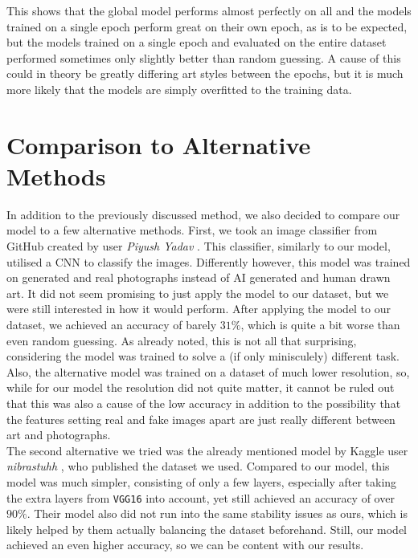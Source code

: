 This shows that the global model performs almost perfectly on all and the models trained on a single epoch perform great on their own epoch, as is to be expected,
but the models trained on a single epoch and evaluated on the entire dataset performed sometimes only slightly better than random guessing.
A cause of this could in theory be greatly differing art styles between the epochs, but it is much more likely that the models
are simply overfitted to the training data. \\

\section{Comparison to Alternative Methods}

In addition to the previously discussed method, we also decided to compare our model to a few alternative methods.
First, we took an image classifier from GitHub created by user \textit{Piyush Yadav} \cite{github_model}.
This classifier, similarly to our model, utilised a CNN to classify the images.
Differently however, this model was trained on generated and real photographs instead of AI generated and human drawn art.
It did not seem promising to just apply the model to our dataset, but we were still interested in how it would perform.
After applying the model to our dataset, we achieved an accuracy of barely $31 \%$, which is quite a bit worse than even random guessing.
As already noted, this is not all that surprising, considering the model was trained to solve a (if only minisculely) different task.
Also, the alternative model was trained on a dataset of much lower resolution, so, while for our model the resolution did not quite matter, it cannot be ruled out
that this was also a cause of the low accuracy in addition to the possibility that the features setting real and fake images apart are just really different between
art and photographs.   \\

The second alternative we tried was the already mentioned model by Kaggle user \textit{nibrastuhh} \cite{useraiartbench}, who published the dataset we used.
Compared to our model, this model was much simpler, consisting of only a few layers, especially after taking the extra layers from \texttt{VGG16} into account,
yet still achieved an accuracy of over $90 \%$.
Their model also did not run into the same stability issues as ours, which is likely helped by them actually balancing the dataset beforehand.
Still, our model achieved an even higher accuracy, so we can be content with our results. \\

